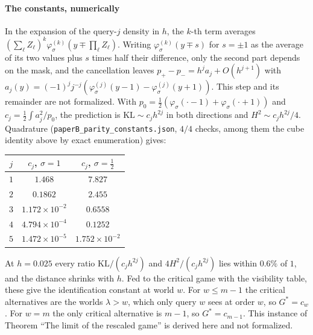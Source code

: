 \paragraph{The constants, numerically} \NUM{} In the expansion of the query-$j$ density in $h$,
the $k$-th term averages $(\sum_\ell Z_\ell)^k\varphi_\sigma^{(k)}(y\mp\prod_\ell Z_\ell)$. Writing
$\varphi_\sigma^{(k)}(y\mp s)$ for $s=\pm1$ as the average of its two values plus $s$ times half
their difference, only the second part depends on the mask, and the cancellation leaves
$p_+-p_-=h^ja_j+O(h^{j+1})$ with
$a_j(y)=(-1)^jj^{-j}(\varphi_\sigma^{(j)}(y-1)-\varphi_\sigma^{(j)}(y+1))$. This step and its
remainder are not formalized. With $p_0=\frac12(\varphi_\sigma(\cdot-1)+\varphi_\sigma(\cdot+1))$ and
$c_j=\frac12\int a_j^2/p_0$, the prediction is $\mathrm{KL}\sim c_jh^{2j}$ in both directions and
$H^2\sim c_jh^{2j}/4$. Quadrature (\texttt{paperB\_parity\_constants.json}, $4/4$ checks, among
them the cube identity above by exact enumeration) gives:
\begin{center}
\footnotesize
\begin{tabular}{@{}ccc@{}}
\toprule
$j$ & $c_j$, $\sigma=1$ & $c_j$, $\sigma=\frac12$\\
\midrule
$1$ & $1.468$ & $7.827$\\
$2$ & $0.1862$ & $2.455$\\
$3$ & $1.172\times10^{-2}$ & $0.6558$\\
$4$ & $4.794\times10^{-4}$ & $0.1252$\\
$5$ & $1.472\times10^{-5}$ & $1.752\times10^{-2}$\\
\bottomrule
\end{tabular}
\end{center}
At $h=0.025$ every ratio $\mathrm{KL}/(c_jh^{2j})$ and $4H^2/(c_jh^{2j})$ lies within $0.6\%$ of
$1$, and the distance shrinks with $h$. Fed to the critical game with the visibility table, these
give the identification constant at world $w$. For $w\le m-1$ the critical alternatives are the
worlds $\lambda>w$, which only query $w$ sees at order $w$, so $G^*=c_w$. For $w=m$ the only
critical alternative is $m-1$, so $G^*=c_{m-1}$. This instance of Theorem ``The limit of the
rescaled game'' is derived here and not formalized.

